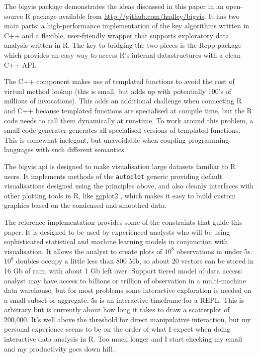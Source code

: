 \documentclass[journal]{vgtc}                %
\begin{document}
The bigvis package demonstrates the ideas discussed in this paper in an open-source R package available from \url{http://github.com/hadley/bigvis}. It has two main parts: a high-performance implementation of the key algorithms written in C++ and a flexible, user-friendly wrapper that supports exploratory data analysis written in R. The key to bridging the two pieces is the Rcpp package \citep{eddelbuettel:2011} which provides an easy way to access R's internal datastructures with a clean C++ API. 

The C++ component makes use of templated functions to avoid the cost of virtual method lookup (this is small, but adds up with potentially 100's of millions of invocations). This adds an additional challenge when connecting R and C++ because templated functions are specialised at compile time, but the R code needs to call them dynamically at run-time. To work around this problem, a small code generater generates all specialised versions of templated functions. This is somewhat inelegant, but unavoidable when coupling programming languages with such different semantics.

The bigvis {\sc api} is designed to make visualisation large datasets familiar to R users. It implements methods of the {\tt autoplot} generic providing default visualisations designed using the principles above, and also cleanly interfaces with other plotting tools in R, like ggplot2 \citep{me:ggplot2,wickham:2007d}, which makes it easy to build custom graphics based on the condensed and smoothed data.

The reference implementation provides some of the constraints that guide this paper. It is designed to be used by experienced analysts who will be using  sophisticated statistical and machine learning models in conjunction with visualisation.  It allows the analyst to create plots of $10^8$ observations in under 5s. $10^8$ doubles occupy a little less than 800 Mb, so about 20 vectors can be stored in 16 Gb of ram, with about 1 Gb left over. Support tiered model of data access: analyst may have access to billions or trillion of observation in a multi-machine data warehouse, but for most problems some interactive exploration is needed on a small subset or aggregate. 5s is an interactive timeframe for a REPL.  This is arbitrary but is currently about how long it takes to draw a scatterplot of 200,000. It's well above the threshold for direct manipulative interaction, but my personal experience seems to be on the order of what I expect when doing interactive data analysis in R.  Too much longer and I start checking my email and my productivity goes down hill.
\end{document}

